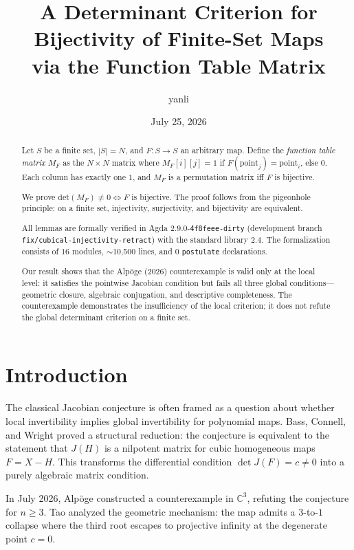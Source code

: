 \documentclass[a4paper,11pt]{article}
\title{A Determinant Criterion for Bijectivity of Finite-Set Maps\\
via the Function Table Matrix}
\author{yanli}
\date{July 25, 2026}
\theoremstyle{definition}
\theoremstyle{remark}
\newcommand{\C}{\mathbb{C}}
\newcommand{\MF}{M_F}
\newcommand{\Det}{\mathrm{det}}
\begin{document}
\maketitle

\begin{abstract}
Let $S$ be a finite set, $|S|=N$, and $F:S\to S$ an arbitrary map.
Define the {\em function table matrix} $\MF$ as the $N\times N$ matrix
where $\MF[i][j]=1$ if $F(\text{point}_j)=\text{point}_i$, else $0$.
Each column has exactly one $1$, and $\MF$ is a permutation matrix iff $F$ is bijective.

We prove $\Det(\MF)\neq 0\iff F$ is bijective.
The proof follows from the pigeonhole principle: on a finite set, injectivity,
surjectivity, and bijectivity are equivalent.

All lemmas are formally verified in Agda $2.9.0$-\texttt{4f8feee-dirty}
(development branch \texttt{fix/cubical-injectivity-retract}) with the
standard library $2.4$. The formalization consists of $16$ modules,
$\sim$10,500 lines, and $0$ \texttt{postulate} declarations.

Our result shows that the Alp\"{o}ge (2026) counterexample is valid only at the
local level: it satisfies the pointwise Jacobian condition but fails all three
global conditions---geometric closure, algebraic conjugation, and descriptive
completeness. The counterexample demonstrates the insufficiency of the local
criterion; it does not refute the global determinant criterion on a finite set.
\end{abstract}

\section{Introduction}

The classical Jacobian conjecture \cite{keller} is often framed as a question
about whether local invertibility implies global invertibility for polynomial
maps. Bass, Connell, and Wright \cite{bcw} proved a structural reduction: the
conjecture is equivalent to the statement that $J(H)$ is a nilpotent matrix
for cubic homogeneous maps $F=X-H$. This transforms the differential condition
$\det J(F)=c\neq0$ into a purely algebraic matrix condition.

In July 2026, Alp\"{o}ge \cite{alpoge} constructed a counterexample in $\C^3$,
refuting the conjecture for $n\geq3$. Tao \cite{tao} analyzed the geometric
mechanism: the map admits a $3$-to-$1$ collapse where the third root escapes
to projective infinity at the degenerate point $c=0$.
\end{document}
